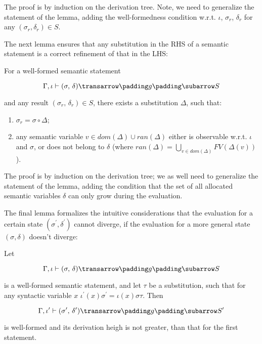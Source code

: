The proof is by induction on the derivation tree. Note, we need to generalize the statement of the lemma, adding the well-formedness
condition w.r.t. $\iota$, $\sigma_r$, $\delta_r$ for any $(\sigma_r, \delta_r) \in S$.

The next lemma ensures that any substitution in the RHS of a semantic statement is a correct refinement of that in the LHS:

\begin{lemma}
\label{two}
\normalfont
For a well-formed semantic statement 

$$
\otrans{\Gamma,\iota}{(\sigma,\,\delta)}{g}{S}
$$ 

\noindent and any result \mbox{$(\sigma_r,\,\delta_r) \in S$}, there exists a substitution $\Delta$, such that:
  \begin{enumerate}
    \item \mbox{$\sigma_r = \sigma\circ\Delta$};
    \item any semantic variable \mbox{$v\in dom(\Delta)\cup ran(\Delta)$} either is observable w.r.t. $\iota$ and $\sigma$,
 or does not belong to $\delta$ (where \mbox{$ran(\Delta)=\bigcup_{v\in dom(\Delta)}FV(\Delta(v))$}).
  \end{enumerate}   
\end{lemma}

The proof is by induction on the derivation tree; we as well need to generalize the statement of the lemma, adding the condition that the 
set of all allocated semantic variables $\delta$ can only grow during the evaluation.

The final lemma formalizes the intuitive considerations that the evaluation for a certain state $(\sigma^\prime,\delta^\prime)$ cannot
diverge, if the evaluation for a more general state $(\sigma,\delta)$ doesn't diverge:

\begin{lemma}
\label{three}
\normalfont
Let 

$$
\otrans{\Gamma,\iota}{(\sigma,\,\delta)}{g}{S}
$$ 

\noindent is a well-formed semantic statement, and let $\tau$ be a substitution, such that 
for any syntactic variable $x$ \mbox{$\iota^\prime(x) \sigma^\prime = \iota(x) \sigma \tau$}. 
Then

$$\otrans{\Gamma,\iota^\prime}{(\sigma^\prime,\,\delta^\prime)}{g}{S^\prime}
$$

\noindent is well-formed and its derivation heigh is not greater, than that for the first statement.
\end{lemma}

